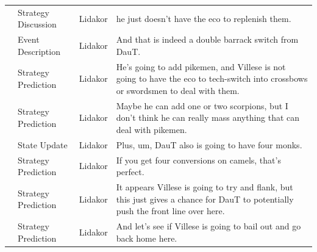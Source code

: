 {\begin{longtable}{@{}>{\theAppRow}r|L{2.3cm}L{1.0cm}U{11.55cm}@{}}
    & Strategy Discussion   & Lidakor & he just doesn't have the eco to replenish them.                                                                                                                                                                                                                                                 \\
    & Event Description     & Lidakor & And that is indeed a double barrack switch from DauT.                                                                                                                                                                                                                                           \\
    & Strategy Prediction   & Lidakor & He's going to add pikemen, and Villese is not going to have the eco to tech-switch into crossbows or swordsmen to deal with them.                                                                                                                                                               \\
    & Strategy Prediction   & Lidakor & Maybe he can add one or two scorpions, but I don't think he can really mass anything that can deal with pikemen.                                                                                                                                                                                \\
    & State Update          & Lidakor & Plus, um, DauT also is going to have four monks.                                                                                                                                                                                                                                                \\
    & Strategy Prediction   & Lidakor & If you get four conversions on camels, that's perfect.                                                                                                                                                                                                                                          \\
    & Strategy Prediction   & Lidakor & It appears Villese is going to try and flank, but this just gives a chance for DauT to potentially push the front line over here.                                                                                                                                                               \\
    & Strategy Prediction   & Lidakor & And let's see if Villese is going to bail out and go back home here.                                                                                                                                                                                                                            \\

\end{longtable}}
